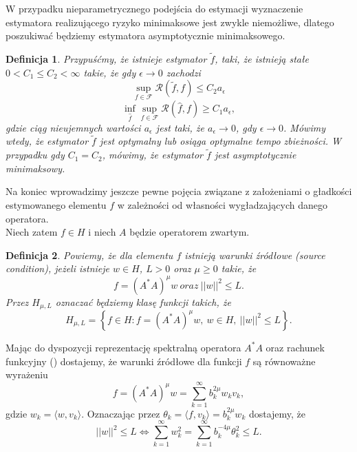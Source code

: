 \documentclass{article}
\newtheorem{df}{Definicja}
\begin{document}
W przypadku nieparametrycznego podejścia do estymacji wyznaczenie estymatora realizującego ryzyko minimaksowe jest zwykle niemożliwe, dlatego poszukiwać będziemy estymatora asymptotycznie minimaksowego. 
\begin{df}
Przypuśćmy, że istnieje estymator $\tilde{f}$, taki, że istnieją stałe $0<C_1\leq C_2<\infty$ takie, że gdy $\epsilon\to 0$ zachodzi 
\begin{displaymath}
\sup_{f\in \mathcal{F}}\mathcal{R}(\tilde{f},f)\leq C_2a_{\epsilon}
\end{displaymath}
\begin{displaymath}
\inf_{\hat{f}}\sup_{f\in \mathcal{F}}\mathcal{R}(\hat{f},f)\geq C_1a_{\epsilon},
\end{displaymath}
gdzie ciąg nieujemnych wartości $a_{\epsilon}$ jest taki, że $a_{\epsilon}\to 0$, gdy $\epsilon\to 0$.
Mówimy wtedy, że estymator $\tilde{f}$ jest optymalny lub osiąga optymalne tempo zbieżności. W przypadku gdy $C_1=C_2$, mówimy, że estymator $\tilde{f}$ jest asymptotycznie minimaksowy.
\end{df}
Na koniec wprowadzimy jeszcze pewne pojęcia związane z założeniami o gładkości estymowanego elementu $f$ w zależności od własności wygładzających danego operatora.\\
Niech zatem $f\in H$ i niech $A$ będzie operatorem zwartym. 
\begin{df}
Powiemy, że dla elementu $f$ istnieją warunki źródłowe (\textit{source condition}), jeżeli istnieje $w\in H$, $L>0$ oraz $\mu\geq 0$ takie, że
\begin{displaymath}
f=(A^*A)^{\mu}w\ oraz\ ||w||^2\leq L.
\end{displaymath}
Przez $H_{\mu,L}$ oznaczać będziemy klasę funkcji 
takich, że
\begin{displaymath}
H_{\mu,L}=\left\{f\in H\colon f=(A^*A)^{\mu}w,\ w\in H,\ ||w||^2\leq L\right\}.
\end{displaymath}
\end{df}
Mając do dyspozycji reprezentację spektralną operatora $A^*A$ oraz rachunek funkcyjny (\cite{hindus}) dostajemy, że warunki źródłowe dla funkcji $f$ są równoważne wyrażeniu
\begin{displaymath}
f=(A^*A)^{\mu}w=\sum_{k=1}^{\infty}b_k^{2\mu}w_kv_k,
\end{displaymath}
gdzie $w_k=\langle w,v_k\rangle$. Oznaczając przez $\theta_k=\langle f,v_k\rangle =b_k^{2\mu}w_k$ dostajemy, że 
\begin{displaymath}
||w||^2\leq L\Longleftrightarrow \sum_{k=1}^{\infty}w_k^2=\sum_{k=1}^{\infty}b_k^{-4\mu}\theta_k^2\leq L.
\end{displaymath}
\end{document}
